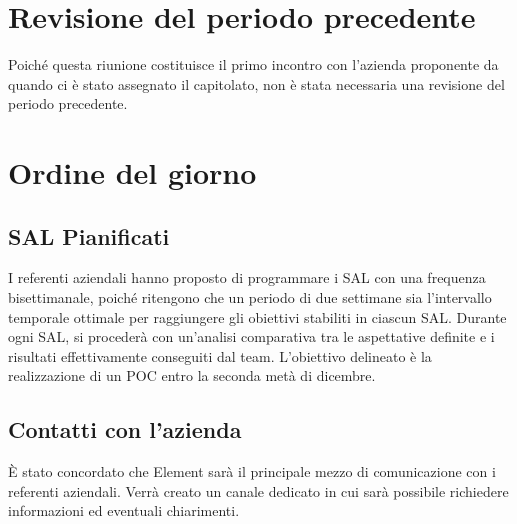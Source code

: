 \documentclass{article}
\begin{document}
\pagebreak


\maketitle
\thispagestyle{fancy}
\tableofcontents
{}
\pagebreak

\flushleft

\section{Revisione del periodo precedente}
    Poiché questa riunione costituisce il primo incontro con l'azienda proponente da quando ci è stato assegnato il capitolato, non è stata necessaria una revisione del periodo precedente.

\section{Ordine del giorno}

    \subsection{SAL Pianificati} 
        I referenti aziendali hanno proposto di programmare i SAL con una frequenza bisettimanale, poiché ritengono che un periodo di due settimane sia l'intervallo temporale ottimale per raggiungere gli obiettivi stabiliti in ciascun SAL. Durante ogni SAL, si procederà con un'analisi comparativa tra le aspettative definite e i risultati effettivamente conseguiti dal team.
        L'obiettivo delineato è la realizzazione di un POC entro la seconda metà di dicembre.

    \subsection{Contatti con l'azienda} 
        È stato concordato che Element sarà il principale mezzo di comunicazione con i referenti aziendali. Verrà creato un canale dedicato in cui sarà possibile richiedere informazioni ed eventuali chiarimenti.
\end{document}
